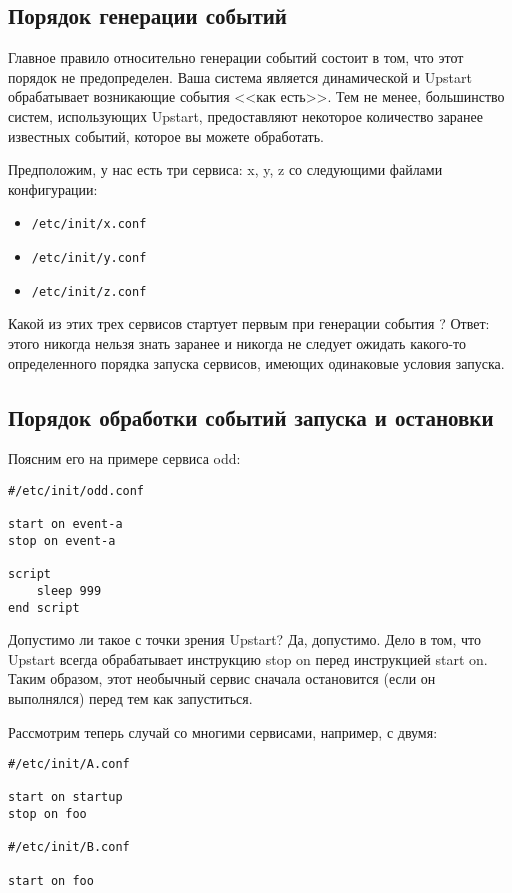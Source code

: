 \subsection{Порядок генерации событий}
Главное правило относительно генерации событий состоит в том, что этот порядок не предопределен. Ваша система является динамической и Upstart обрабатывает возникающие события <<как есть>>. Тем не менее, большинство систем, использующих Upstart, предоставляют некоторое количество заранее известных событий, которое вы можете обработать.

Предположим, у нас есть три сервиса: x, y, z со следующими файлами конфигурации: \begin{itemize}
\item \begin{verbatim}
/etc/init/x.conf
\end{verbatim}
\item \begin{verbatim}
/etc/init/y.conf
\end{verbatim}
\item \begin{verbatim}
/etc/init/z.conf
\end{verbatim}
\end{itemize}

Какой из этих трех сервисов стартует первым при генерации события ? Ответ: этого никогда нельзя знать заранее и никогда не следует ожидать какого-то определенного порядка запуска сервисов, имеющих одинаковые условия запуска. 
\subsection{Порядок обработки событий запуска и остановки}
Поясним его на примере сервиса odd: \begin{verbatim}
#/etc/init/odd.conf

start on event-a
stop on event-a

script 
	sleep 999
end script
\end{verbatim}
Допустимо ли такое с точки зрения Upstart? Да, допустимо. Дело в том, что Upstart всегда обрабатывает инструкцию stop on перед инструкцией start on. Таким образом, этот необычный сервис сначала остановится (если он выполнялся) перед тем как запуститься.

Рассмотрим теперь случай со многими сервисами, например, с двумя: \begin{verbatim}
#/etc/init/A.conf

start on startup
stop on foo

#/etc/init/B.conf

start on foo
\end{verbatim}

